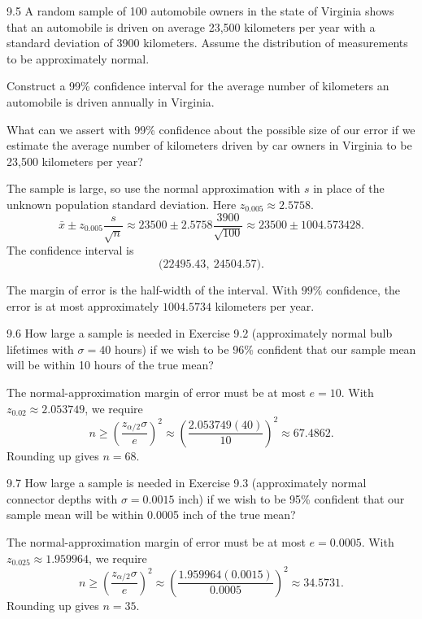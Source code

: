 \documentclass[11pt,oneside]{article}
\begin{document}
\begin{exercise}{9.5}
A random sample of 100 automobile owners in the state of Virginia shows that an automobile is driven on average 23,500 kilometers per year with a standard deviation of 3900 kilometers. Assume the distribution of measurements to be approximately normal.
\begin{exercisesubparts}
\item Construct a 99\% confidence interval for the average number of kilometers an automobile is driven annually in Virginia.
\item What can we assert with 99\% confidence about the possible size of our error if we estimate the average number of kilometers driven by car owners in Virginia to be 23,500 kilometers per year?
\end{exercisesubparts}
\end{exercise}
\begin{solution}
\begin{exercisesubparts}
\item The sample is large, so use the normal approximation with $s$ in place of the unknown population standard deviation. Here $z_{0.005}\approx 2.5758$.
\[
\bar x\pm z_{0.005}\frac{s}{\sqrt n}\approx 23500\pm 2.5758\frac{3900}{\sqrt{100}}\approx 23500\pm 1004.573428.
\]
The confidence interval is 
\[
\boxed{\bigl(22495.43,\ 24504.57\bigr)}.
\]

\item The margin of error is the half-width of the interval. With $99\%$ confidence, the error is at most approximately $\boxed{1004.5734}$ kilometers per year.
\end{exercisesubparts}
\end{solution}

\begin{exercise}{9.6}
How large a sample is needed in Exercise 9.2 (approximately normal bulb lifetimes with $\sigma=40$ hours) if we wish to be 96\% confident that our sample mean will be within 10 hours of the true mean?
\end{exercise}
\begin{solution}
The normal-approximation margin of error must be at most $e=10$. With $z_{0.02}\approx 2.053749$, we require
\[
n\ge \left(\frac{z_{\alpha/2}\sigma}{e}\right)^2\approx \left(\frac{2.053749(40)}{10}\right)^2\approx 67.4862.
\]
Rounding up gives $\boxed{n=68}$.
\end{solution}

\begin{exercise}{9.7}
How large a sample is needed in Exercise 9.3 (approximately normal connector depths with $\sigma=0.0015$ inch) if we wish to be 95\% confident that our sample mean will be within 0.0005 inch of the true mean?
\end{exercise}
\begin{solution}
The normal-approximation margin of error must be at most $e=0.0005$. With $z_{0.025}\approx 1.959964$, we require
\[
n\ge \left(\frac{z_{\alpha/2}\sigma}{e}\right)^2\approx \left(\frac{1.959964(0.0015)}{0.0005}\right)^2\approx 34.5731.
\]
Rounding up gives $\boxed{n=35}$.
\end{solution}
\end{document}
